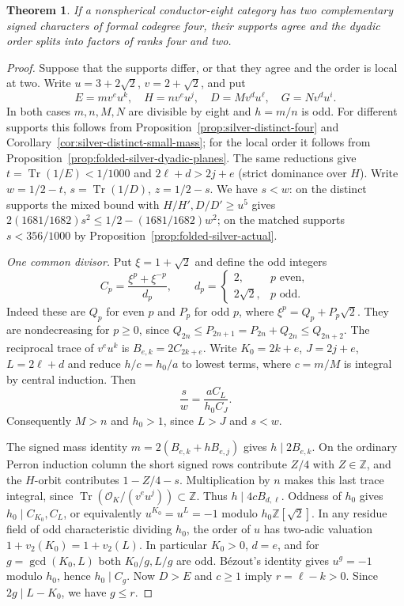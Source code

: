 \documentclass[11pt,reqno]{amsart}
\newtheorem{theorem}{Theorem}[section]
\theoremstyle{remark}\newtheorem{remark}[theorem]{Remark}
\numberwithin{equation}{section}
\begin{document}
\begin{theorem}\label{thm:silver-distinct-round3}
If a nonspherical conductor-eight category has two complementary
signed characters of formal codegree four, their supports agree and
the dyadic order splits into factors of ranks four and two.
\end{theorem}
\begin{proof}
Suppose that the supports differ, or that they agree and the order is
local at two. Write $u=3+2\sqrt2$, $v=2+\sqrt2$, and put
\[
 E=mv^eu^k,\quad H=nv^eu^j,\quad
 D=Mv^du^\ell,\quad G=Nv^du^i.
\]
In both cases $m,n,M,N$ are divisible by eight and $h=m/n$ is odd.
For different supports this follows from
Proposition~\ref{prop:silver-distinct-four} and
Corollary~\ref{cor:silver-distinct-small-mass}; for the local order
it follows from Proposition~\ref{prop:folded-silver-dyadic-planes}.
The same reductions give $t=\operatorname{Tr}(1/E)<1/1000$ and
$2\ell+d>2j+e$ (strict dominance over $H$).
Write $w=1/2-t$, $s=\operatorname{Tr}(1/D)$, $z=1/2-s$.
We have $s<w$: on the distinct supports the mixed
bound with $H/H',D/D'\ge u^5$ gives
$2(1681/1682)s^2\le1/2-(1681/1682)w^2$; on the matched supports
$s<356/1000$ by Proposition~\ref{prop:folded-silver-actual}.

\smallskip\noindent\emph{One common divisor.}
Put $\xi=1+\sqrt2$ and define the odd integers
\[
 C_p=\frac{\xi^p+\xi^{-p}}{d_p},\qquad
 d_p=\begin{cases}2,&p\text{ even},\\2\sqrt2,&p\text{ odd}.\end{cases}
\]
Indeed these are $Q_p$ for even $p$ and $P_p$ for odd $p$, where
$\xi^p=Q_p+P_p\sqrt2$. They are nondecreasing for $p\ge0$, since
$Q_{2n}\le P_{2n+1}=P_{2n}+Q_{2n}\le Q_{2n+2}$.
The reciprocal trace of $v^e u^k$ is $B_{e,k}=2C_{2k+e}$.
Write $K_0=2k+e$, $J=2j+e$, $L=2\ell+d$ and reduce
$h/c=h_0/a$ to lowest terms, where $c=m/M$ is integral by
central induction. Then
\[
 \frac{s}{w}=\frac{aC_L}{h_0C_J}.
\]
Consequently $M>n$ and $h_0>1$, since $L>J$ and $s<w$.

The signed mass identity $m=2(B_{e,k}+h B_{e,j})$ gives
$h\mid2B_{e,k}$. On the ordinary Perron induction column the short
signed rows contribute $Z/4$ with $Z\in\mathbb Z$, and the
$H$-orbit contributes $1-Z/4-s$. Multiplication by $n$ makes this
last trace integral, since $\operatorname{Tr}(\mathcal O_K/(v^e u^j))
\subset\mathbb Z$. Thus $h\mid4cB_{d,\ell}$. Oddness of $h_0$
gives $h_0\mid C_{K_0},C_L$, or equivalently
$u^{K_0}=u^L=-1$ modulo $h_0\mathbb Z[\sqrt2]$.
In any residue field of odd characteristic dividing $h_0$, the order of $u$
has two-adic valuation $1+v_2(K_0)=1+v_2(L)$. In particular
$K_0>0$, $d=e$, and for $g=\gcd(K_0,L)$ both $K_0/g,L/g$ are odd.
Bézout's identity gives $u^g=-1$ modulo $h_0$, hence $h_0\mid C_g$.
Now $D>E$ and $c\ge1$ imply $r=\ell-k>0$. Since $2g\mid L-K_0$,
we have $g\le r$.


\end{proof}
\end{document}

